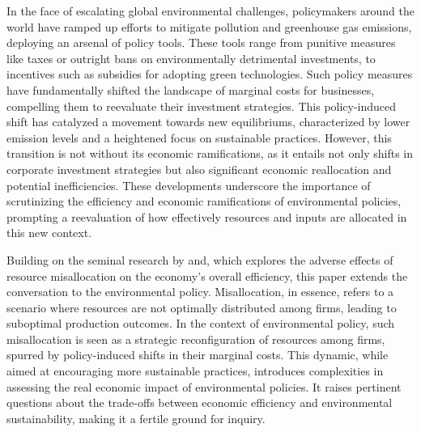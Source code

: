 In the face of escalating global environmental challenges, policymakers around the world have ramped up efforts to mitigate pollution and greenhouse gas emissions, deploying an arsenal of policy tools. These tools range from punitive measures like taxes or outright bans on environmentally detrimental investments, to incentives such as subsidies for adopting green technologies. Such policy measures have fundamentally shifted the landscape of marginal costs for businesses, compelling them to reevaluate their investment strategies. This policy-induced shift has catalyzed a movement towards new equilibriums, characterized by lower emission levels and a heightened focus on sustainable practices. However, this transition is not without its economic ramifications, as it entails not only shifts in corporate investment strategies but also significant economic reallocation and potential inefficiencies. These developments underscore the importance of scrutinizing the efficiency and economic ramifications of environmental policies, prompting a reevaluation of how effectively resources and inputs are allocated in this new context.

Building on the seminal research by \cite{whited2021misallocation} and\cite{hsieh2009misallocation}, which explores the adverse effects of resource misallocation on the economy's overall efficiency, this paper extends the conversation to the environmental policy. Misallocation, in essence, refers to a scenario where resources are not optimally distributed among firms, leading to suboptimal production outcomes. In the context of environmental policy, such misallocation is seen as a strategic reconfiguration of resources among firms, spurred by policy-induced shifts in their marginal costs. This dynamic, while aimed at encouraging more sustainable practices, introduces complexities in assessing the real economic impact of environmental policies. It raises pertinent questions about the trade-offs between economic efficiency and environmental sustainability, making it a fertile ground for inquiry.

